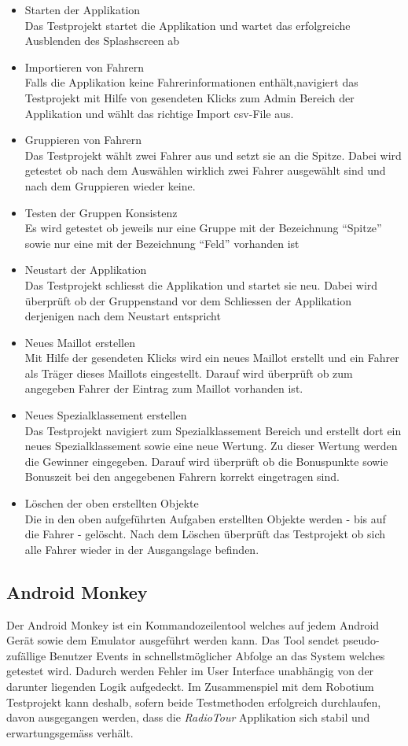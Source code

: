 \begin{itemize}
\item Starten der Applikation\\
Das Testprojekt startet die Applikation und wartet das erfolgreiche Ausblenden des Splashscreen ab
\item Importieren von Fahrern\\
Falls die Applikation keine Fahrerinformationen enthält,navigiert das Testprojekt mit Hilfe von gesendeten Klicks zum Admin Bereich der Applikation und wählt das richtige Import csv-File aus.
\item Gruppieren von Fahrern\\
Das Testprojekt wählt zwei Fahrer aus und setzt sie an die Spitze. Dabei wird getestet ob nach dem Auswählen wirklich zwei Fahrer ausgewählt sind und nach dem Gruppieren wieder keine.
\item Testen der Gruppen Konsistenz\\
Es wird getestet ob jeweils nur eine Gruppe mit der Bezeichnung "`Spitze"' sowie nur eine mit der Bezeichnung "`Feld"' vorhanden ist
\item Neustart der Applikation \\
Das Testprojekt schliesst die Applikation und startet sie neu. Dabei wird überprüft ob der Gruppenstand vor dem Schliessen der Applikation derjenigen nach dem Neustart entspricht
\item Neues Maillot erstellen\\
Mit Hilfe der gesendeten Klicks wird ein neues Maillot erstellt und ein Fahrer als Träger dieses Maillots eingestellt. Darauf wird überprüft ob zum angegeben Fahrer der Eintrag zum Maillot vorhanden ist.
\item Neues Spezialklassement erstellen\\
Das Testprojekt navigiert zum Spezialklassement Bereich und erstellt dort ein neues Spezialklassement sowie eine neue Wertung. Zu dieser Wertung werden die Gewinner eingegeben. Darauf wird überprüft ob die Bonuspunkte sowie Bonuszeit bei den angegebenen Fahrern korrekt eingetragen sind.
\item Löschen der oben erstellten Objekte \\
Die in den oben aufgeführten Aufgaben erstellten Objekte werden - bis auf die Fahrer -  gelöscht. Nach dem Löschen überprüft das Testprojekt ob sich alle Fahrer wieder in der Ausgangslage befinden.
 

\end{itemize}

\subsection{Android Monkey}
Der Android Monkey ist ein Kommandozeilentool welches auf jedem Android Gerät sowie dem Emulator ausgeführt werden kann. Das Tool sendet pseudo-zufällige Benutzer Events in schnellstmöglicher Abfolge an das System welches getestet wird. Dadurch werden Fehler im User Interface unabhängig von der darunter liegenden Logik aufgedeckt. Im Zusammenspiel mit dem Robotium Testprojekt kann deshalb, sofern beide Testmethoden erfolgreich durchlaufen, davon ausgegangen werden, dass die \textit{RadioTour} Applikation sich stabil und erwartungsgemäss verhält.

